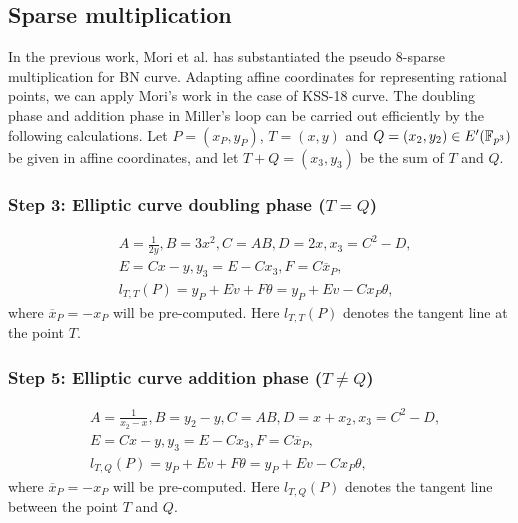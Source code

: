 \subsection{Sparse multiplication }
In the previous work, Mori et al. \cite{PAIRING:MANS13} has substantiated the pseudo 8-sparse multiplication for BN curve. 
Adapting affine coordinates for representing rational points, we can apply Mori's work in the case of KSS-18 curve. The doubling phase and addition phase in Miller's loop can be carried out efficiently by the following calculations. Let $P=(x_P,y_P)$, $T=(x,y)$ and $Q=(x_2,y_2)\in E'(\mathbb{F}_{p^{3}})$ be given in affine coordinates, and let $T+Q=(x_3,y_3)$ be the sum of $T$ and $Q$.
\subsubsection{Step 3: Elliptic curve doubling phase \texorpdfstring{($T = Q$)}{}}
\begin{eqnarray}
&A=\frac{1}{2y}, B=3x^2, C=AB, D=2x, x_3=C^2-D,\nonumber\\
&E=Cx-y, y_3=E-Cx_3, F=C\overline{x}_P,\nonumber\\
&l_{T,T}(P)=y_P+Ev+F\theta=y_P+Ev-Cx_P\theta,\label{icisc16_kss18_sparse_dbl}
\end{eqnarray}
where $\overline{x}_P=-x_P$ will be pre-computed. Here $l_{T,T}(P)$ denotes the tangent line at the point $T$.
\subsubsection{Step 5: Elliptic curve addition phase \texorpdfstring{($T\neq Q$)}{}}
\begin{eqnarray}
&A=\frac{1}{x_2-x}, B=y_2-y, C=AB, D=x+x_2, x_3=C^2-D,\nonumber\\
&E=Cx-y, y_3=E-Cx_3, F=C\overline{x}_P,\nonumber\\
&l_{T,Q}(P)=y_P+Ev+F\theta=y_P+Ev-Cx_P\theta,\label{icisc16_kss18_sparse_add}
\end{eqnarray}
where $\overline{x}_P=-x_P$ will be pre-computed. Here $l_{T,Q}(P)$ denotes the tangent line between the point $T$ and $Q$.

